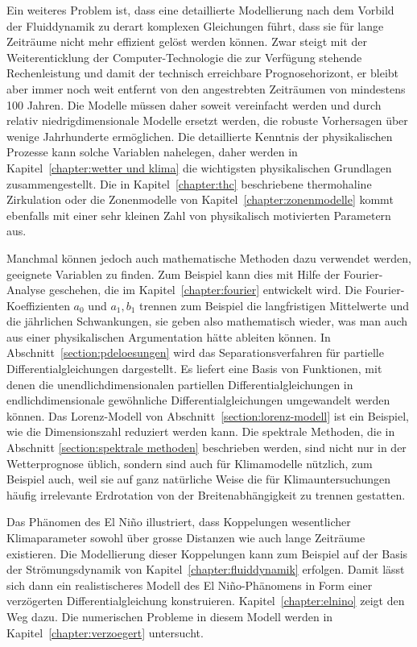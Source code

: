 Ein weiteres Problem ist, dass eine detaillierte Modellierung nach dem
Vorbild der Fluiddynamik zu derart komplexen Gleichungen führt, dass 
sie für lange Zeiträume nicht mehr effizient gelöst werden können.
Zwar steigt mit der Weiterenticklung der Computer-Technologie die 
zur Verfügung stehende Rechenleistung und damit der technisch erreichbare
Prognosehorizont, er bleibt aber immer noch weit entfernt von den
angestrebten Zeiträumen von mindestens 100 Jahren.
Die Modelle müssen daher soweit vereinfacht werden und durch relativ
niedrigdimensionale Modelle ersetzt werden, die robuste Vorhersagen
über wenige Jahrhunderte ermöglichen.
Die detaillierte Kenntnis der physikalischen Prozesse kann solche 
Variablen nahelegen, daher werden in Kapitel~\ref{chapter:wetter und klima}
die wichtigsten physikalischen Grundlagen zusammengestellt.
Die in Kapitel~\ref{chapter:thc} beschriebene thermohaline Zirkulation
oder die Zonenmodelle von Kapitel~\ref{chapter:zonenmodelle}
kommt ebenfalls mit einer sehr kleinen Zahl von physikalisch motivierten
Parametern aus.

Manchmal können jedoch auch mathematische Methoden dazu verwendet werden,
geeignete Variablen zu finden.
Zum Beispiel kann dies mit Hilfe der Fourier-Analyse geschehen, die
im Kapitel~\ref{chapter:fourier} entwickelt wird.
Die Fourier-Koeffizienten $a_0$ und $a_1,b_1$ trennen zum Beispiel die
langfristigen Mittelwerte und die jährlichen Schwankungen, sie geben
also mathematisch wieder, was man auch aus einer physikalischen
Argumentation hätte ableiten können.
In Abschnitt~\ref{section:pdeloesungen} wird das Separationsverfahren 
für partielle Differentialgleichungen dargestellt.
Es liefert eine Basis von Funktionen, mit denen die unendlichdimensionalen
partiellen Differentialgleichungen in endlichdimensionale gewöhnliche
Differentialgleichungen umgewandelt werden können.
Das Lorenz-Modell von Abschnitt~\ref{section:lorenz-modell} ist ein
Beispiel, wie die Dimensionszahl reduziert werden kann.
Die spektrale Methoden, die in Abschnitt \ref{section:spektrale methoden}
beschrieben werden, sind nicht nur in der Wetterprognose üblich, sondern
sind auch für Klimamodelle nützlich, zum Beispiel auch, weil sie auf
ganz natürliche Weise die für Klimauntersuchungen häufig irrelevante
Erdrotation von der Breitenabhängigkeit zu trennen gestatten.

Das Phänomen des El Niño illustriert, dass Koppelungen wesentlicher
Klimaparameter sowohl über grosse Distanzen wie auch lange Zeiträume
existieren.
Die Modellierung dieser Koppelungen kann zum Beispiel auf der Basis
der Strömungsdynamik von Kapitel~\ref{chapter:fluiddynamik} erfolgen.
Damit lässt sich dann ein realistischeres Modell des El Niño-Phänomens
in Form einer verzögerten Differentialgleichung konstruieren.
Kapitel~\ref{chapter:elnino} zeigt den Weg dazu.
Die numerischen Probleme in diesem Modell werden in
Kapitel~\ref{chapter:verzoegert} untersucht.


